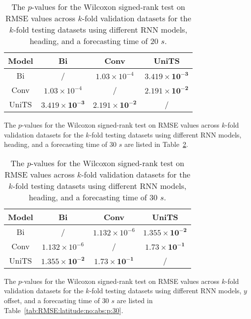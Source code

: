 \begin{table}[!ht]
	\centering
	\begin{tabular}{|c|c|c|c|}
		\hline
		Model & Bi & Conv & UniTS \\ \hline
		Bi & / & $1.03 \times 10^{-4}$ & $\mathbf{3.419 \times 10^{-3}}$ \\ \hline
		Conv & $1.03 \times 10^{-4}$ & / & $\mathbf{2.191 \times 10^{-2}}$ \\ \hline
		UniTS & $\mathbf{3.419 \times 10^{-3}}$ & $\mathbf{2.191 \times 10^{-2}}$ & / \\ \hline
	\end{tabular}
	\caption{The $p$-values for the Wilcoxon signed-rank test on RMSE values across $k$-fold validation datasets for the $k$-fold testing datasets using different RNN models, heading, and a forecasting time of $20$ $s$.}
	\label{tab:RMSE:direction:p:20}
\end{table}

The $p$-values for the Wilcoxon signed-rank test on RMSE values across $k$-fold validation datasets for the $k$-fold testing datasets using different RNN models, heading, and a forecasting time of $30$ $s$ are listed in Table~\ref{tab:RMSE:direction:p:30}.

\begin{table}[!ht]
	\centering
	\begin{tabular}{|c|c|c|c|}
		\hline
		Model & Bi & Conv & UniTS \\ \hline
		Bi & / & $1.132 \times 10^{-6}$ & $\mathbf{1.355 \times 10^{-2}}$ \\ \hline
		Conv & $1.132 \times 10^{-6}$ & / & $\mathbf{1.73 \times 10^{-1}}$ \\ \hline
		UniTS & $\mathbf{1.355 \times 10^{-2}}$ & $\mathbf{1.73 \times 10^{-1}}$ & / \\ \hline
	\end{tabular}
	\caption{The $p$-values for the Wilcoxon signed-rank test on RMSE values across $k$-fold validation datasets for the $k$-fold testing datasets using different RNN models, heading, and a forecasting time of $30$ $s$.}
	\label{tab:RMSE:direction:p:30}
\end{table}

The $p$-values for the Wilcoxon signed-rank test on RMSE values across $k$-fold validation datasets for the $k$-fold testing datasets using different RNN models, $y$ offset, and a forecasting time of $30$ $s$ are listed in Table~\ref{tab:RMSE:latitude:no:abs:p:30}.

